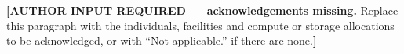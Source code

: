 \documentclass[referee,lineno,pdflatex,sn-vancouver-num]{sn-jnl}
\theoremstyle{thmstyleone}%
\theoremstyle{thmstyletwo}%
\theoremstyle{thmstylethree}%
\begin{document}

\textbf{[AUTHOR INPUT REQUIRED --- acknowledgements missing.} Replace this
paragraph with the individuals, facilities and compute or storage allocations
to be acknowledged, or with ``Not applicable.'' if there are none.\textbf{]}

\end{document}

